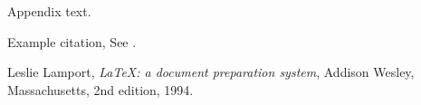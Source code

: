 \documentclass[preprint,12pt,authoryear]{elsarticle}
\begin{document}
Appendix text.

Example citation, See \citet{lamport94}.




\begin{thebibliography}{00}


  Leslie Lamport,
  \textit{\LaTeX: a document preparation system},
  Addison Wesley, Massachusetts,
  2nd edition,
  1994.

\end{thebibliography}
\end{document}
